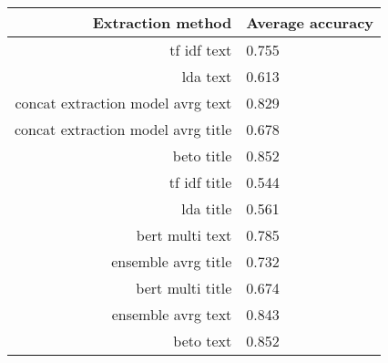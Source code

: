 \begin{tabular}{|r|l|}
  \hline
  Extraction method & Average accuracy \\ 
  \hline
  tf idf text & 0.755 \\ 
  \hline
  lda text & 0.613 \\ 
  \hline
  concat extraction model avrg text & 0.829 \\ 
  \hline
  concat extraction model avrg title & 0.678 \\ 
  \hline
  beto title & 0.852 \\ 
  \hline
  tf idf title & 0.544 \\ 
  \hline
  lda title & 0.561 \\ 
  \hline
  bert multi text & 0.785 \\ 
  \hline
  ensemble avrg title & 0.732 \\ 
  \hline
  bert multi title & 0.674 \\ 
  \hline
  ensemble avrg text & 0.843 \\ 
  \hline
  beto text & 0.852 \\ 
  \hline
\end{tabular}
